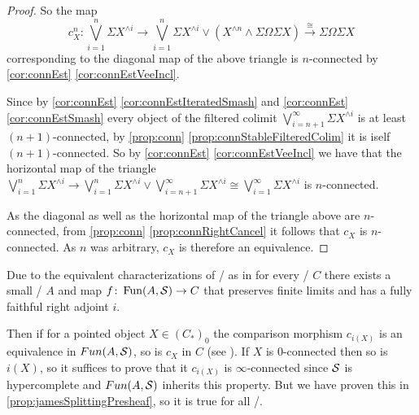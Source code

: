 \begin{prop}
\begin{proof}
        So the map 
        \begin{equation*}
            c_X^n\colon\bigvee\limits_{i=1}^n\Sigma X^{\wedge i}\to\bigvee\limits_{i=1}^n\Sigma X^{\wedge i}\vee\left(X^{\wedge n}\wedge\Sigma\Omega\Sigma X\right)\xrightarrow{\cong}\Sigma\Omega\Sigma X
        \end{equation*}
        corresponding to the diagonal map of the above triangle is $n$-connected by \cref{cor:connEst} \ref{cor:connEstVeeIncl}.

        Since by \cref{cor:connEst} \ref{cor:connEstIteratedSmash} and \cref{cor:connEst} \ref{cor:connEstSmash} every object of the filtered colimit $\bigvee\limits_{i=n+1}^{\infty}\Sigma X^{\wedge i}$ is at least $(n+1)$-connected, by \cref{prop:conn} \ref{prop:connStableFilteredColim} it is iself $(n+1)$-connected.
        So by \cref{cor:connEst} \ref{cor:connEstVeeIncl} we have that the horizontal map of the triangle $\bigvee\limits_{i=1}^n\Sigma X^{\wedge i}\to\bigvee\limits_{i=1}^n\Sigma X^{\wedge i}\vee\bigvee\limits_{i=n+1}^{\infty}\Sigma X^{\wedge i}\cong\bigvee\limits_{i=1}^{\infty}\Sigma X^{\wedge i}$ is $n$-connected.

        As the diagonal as well as the horizontal map of the triangle above are $n$-connected, from \cref{prop:conn} \ref{prop:connRightCancel} it follows that $c_X$ is $n$-connected. 
        As $n$ was arbitrary, $c_X$ is therefore an equivalence.
    \end{proof}
\end{prop}
\begin{remark}\label{rem:genTopoiComparisonMapEq}
    Due to the equivalent characterizations of \inftytops/ as in %
    for every \inftytop/ $C$ there exists a small \inftycat/ $A$ and map $f\colon\operatorname{Fun}(A,\mathcal{S})\to C$ that preserves finite limits and has a fully faithful right adjoint $i$.
    
    Then if for a pointed object $X\in\left(C_*\right)_0$ the comparison morphism $c_{i(X)}$ is an equivalence in $Fun(A,\mathcal{S})$, so is $c_X$ in $C$ (see %
    ).
    If $X$ is $0$-connected then so is $i(X)$, so it suffices to prove that it $c_{i(X)}$ is $\infty$-connected since $\mathcal{S}$ is hypercomplete and $Fun(A,\mathcal{S})$ inherits this property. %
    But we have proven this in \cref{prop:jamesSplittingPresheaf}, so it is true for all \inftytops/.
\end{remark}
